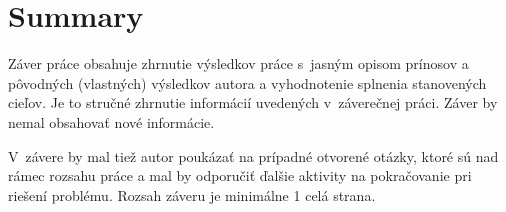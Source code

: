 
\chapter{Summary}
\label{summary}

Záver práce obsahuje zhrnutie výsledkov práce s~jasným opisom prínosov a pôvodných (vlastných) výsledkov autora a vyhodnotenie splnenia stanovených cieľov. Je to stručné zhrnutie informácií uvedených v~záverečnej práci. Záver by nemal obsahovať nové informácie.

V~závere by mal tiež autor poukázať na prípadné otvorené otázky, ktoré sú nad rámec rozsahu práce a mal by odporučiť ďalšie aktivity na pokračovanie pri riešení problému. Rozsah záveru je minimálne 1 celá strana.

